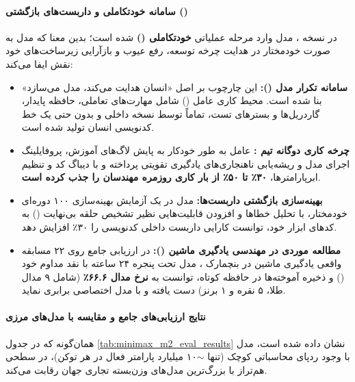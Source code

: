 \paragraph*{سامانه خودتکاملی و داربست‌های بازگشتی ()}
در نسخه ، مدل وارد مرحله عملیاتی \textbf{خودتکاملی ()} شده است؛ بدین معنا که مدل به صورت خودمختار در هدایت چرخه توسعه، رفع عیوب و بازآرایی زیرساخت‌های خود نقش ایفا می‌کند:
\begin{itemize}
    \item \textbf{سامانه تکرار مدل ():} این چارچوب بر اصل «انسان هدایت می‌کند، مدل می‌سازد» بنا شده است. محیط کاری عامل () شامل مهارت‌های تعاملی، حافظه پایدار، گاردریل‌ها و بسترهای تست، تماماً توسط نسخه داخلی  و بدون حتی یک خط کدنویسی انسان تولید شده است.
    \item \textbf{چرخه کاری دوگانه تیم :} عامل به طور خودکار به پایش لاگ‌های آموزش، پروفایلینگ اجرای مدل و ریشه‌یابی ناهنجاری‌های یادگیری تقویتی پرداخته و با دیباگ کد و تنظیم ابرپارامترها، \textbf{۳۰٪ تا ۵۰٪ از بار کاری روزمره مهندسان  را جذب کرده است}.
    \item \textbf{بهینه‌سازی بازگشتی داربست‌ها:} مدل در یک آزمایش بهینه‌سازی ۱۰۰ دوره‌ای خودمختار، با تحلیل خطاها و افزودن قابلیت‌هایی نظیر تشخیص حلقه بی‌نهایت () به کدهای ابزار خود، توانست کارایی داربست داخلی کدنویسی را ۳۰٪ افزایش دهد.
    \item \textbf{مطالعه موردی در مهندسی یادگیری ماشین ():} در ارزیابی جامع روی ۲۲ مسابقه واقعی یادگیری ماشین در بنچمارک  \cite{chan2025mlebench}، مدل تحت پنجره ۲۴ ساعته با نقد مداوم خود () و ذخیره آموخته‌ها در حافظه کوتاه، توانست به \textbf{نرخ مدال ۶۶.۶٪} (شامل ۹ مدال طلا، ۵ نقره و ۱ برنز) دست یافته و با مدل اختصاصی  برابری نماید.
\end{itemize}

\paragraph*{نتایج ارزیابی‌های جامع و مقایسه با مدل‌های مرزی}
همان‌گونه که در جدول \ref{tab:minimax_m2_eval_results} نشان داده شده است، مدل  با وجود ردپای محاسباتی کوچک (تنها $\sim$۱۰ میلیارد پارامتر فعال در هر توکن)، در سطحی هم‌تراز با بزرگ‌ترین مدل‌های وزن‌بسته تجاری جهان رقابت می‌کند.

